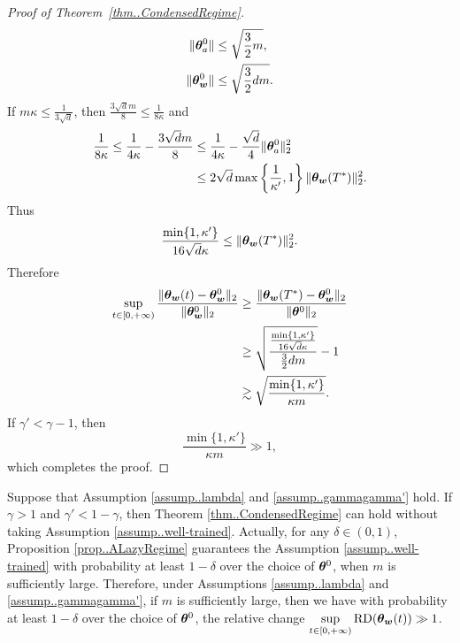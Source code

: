 \documentclass{article}
\begin{document}
\begin{proof}[Proof of Theorem~\ref{thm..CondensedRegime}]
    \begin{align*}
        \lVert\bm{\theta}^0_{a}\rVert
        &\leq \sqrt{\frac{3}{2}m},\\
        \lVert\bm{\theta}^0_{\bm{w}}\rVert
        &\leq \sqrt{\frac{3}{2}dm}.
    \end{align*}
    If $m\kappa\leq \frac{1}{3\sqrt{d}}$, then $\frac{3\sqrt{d}m}{8}\leq \frac{1}{8\kappa}$ and
    \begin{align*}
        \frac{1}{8\kappa}
        \leq \frac{1}{4\kappa}-\frac{3\sqrt{d}m}{8}
        &\leq \frac{1}{4\kappa}-\frac{\sqrt{d}}{4}\lVert\bm{\theta}_{a}^0\rVert_2^2\\
        &\leq 2\sqrt{d}\max\left\{\frac{1}{\kappa'},1\right\}\lVert\bm{\theta}_{\bm{w}}(T^*)\rVert_2^2.
    \end{align*}
    Thus
    \begin{equation*}
        \frac{\min\{1,\kappa'\}}{16\sqrt{d}\kappa}\leq \lVert\bm{\theta}_{\bm{w}}(T^*)\rVert_2^2.
    \end{equation*}
    Therefore
    \begin{equation*}
        \begin{aligned}
            \sup\limits_{t\in[0,+\infty)}\frac{\lVert\bm{\theta}_{\bm{w}}(t)-\bm{\theta}_{\bm{w}}^0\rVert_2}{\lVert\bm{\theta}^0_{\bm{w}}\rVert_2}
             & \geq \frac{\lVert\bm{\theta}_{\bm{w}}(T^*)-\bm{\theta}_{\bm{w}}^0\rVert_2}{\lVert\bm{\theta}^0\rVert_2}                                      \\
             & \geq \sqrt{\frac{\frac{\min\{1,\kappa'\}}{16\sqrt{d}\kappa}
             }{\frac{3}{2}dm}} - 1 \\
             & \gtrsim \sqrt{\frac{\min\{1,\kappa'\}}{\kappa m}}.
        \end{aligned}
    \end{equation*}
    If $\gamma'<\gamma-1$, then
    \begin{equation*}
        \frac{\min\{1,\kappa'\}}{\kappa m}\gg 1,
    \end{equation*}
    which completes the proof.
\end{proof}
\begin{rmk}
    Suppose that Assumption \ref{assump..lambda} and \ref{assump..gammagamma'} hold. If $\gamma>1$ and $\gamma'<1-\gamma$, then Theorem \ref{thm..CondensedRegime} can hold without taking Assumption \ref{assump..well-trained}. Actually, for any $\delta\in(0,1)$, Proposition \ref{prop..ALazyRegime} guarantees the Assumption \ref{assump..well-trained} with probability at least $1-\delta$ over the choice of $\bm{\theta}^0$, when $m$ is sufficiently large. Therefore, under Assumptions \ref{assump..lambda} and \ref{assump..gammagamma'}, if $m$ is sufficiently large, then we have with probability at least $1-\delta$ over the choice of $\bm{\theta}^0$, the relative change $\sup\limits_{t\in[0,+\infty)}\mathrm{RD}(\bm{\theta}_{\bm{w}}(t))\gg 1$.
\end{rmk}
\end{document}
